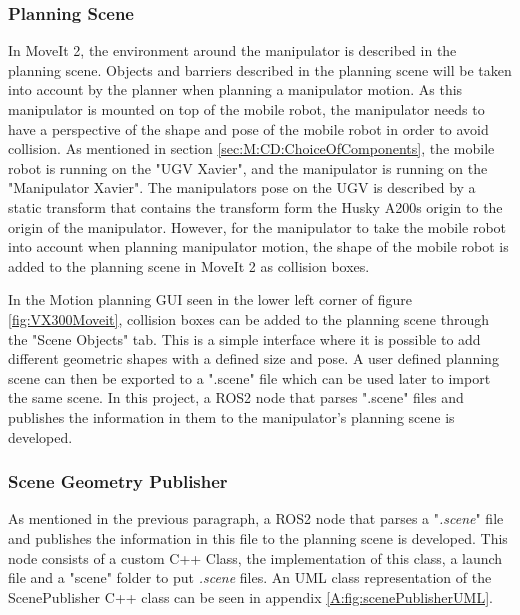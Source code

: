 \subsubsection{Planning Scene}
In MoveIt 2, the environment around the manipulator is described in the planning scene. Objects and barriers described in the planning scene will be taken into account by the planner when planning a manipulator motion. As this manipulator is mounted on top of the mobile robot, the manipulator needs to have a perspective of the shape and pose of the mobile robot in order to avoid collision. As mentioned in section \ref{sec:M:CD:ChoiceOfComponents}, the mobile robot is running on the "UGV Xavier", and the manipulator is running on the "Manipulator Xavier". 
The manipulators pose on the UGV is described by a static transform that contains the transform form the Husky A200s origin to the origin of the manipulator. However, for the manipulator to take the mobile robot into account when planning manipulator motion, the shape of the mobile robot is added to the planning scene in MoveIt 2 as collision boxes.

In the Motion planning GUI seen in the lower left corner of figure \ref{fig:VX300Moveit}, collision boxes can be added to the planning scene through the "Scene Objects" tab. This is a simple interface where it is possible to add different geometric shapes with a defined size and pose. A user defined planning scene can then be exported to a ".scene" file which can be used later to import the same scene. In this project, a ROS2 node that parses ".scene" files and publishes the information in them to the manipulator's planning scene is developed.

\subsubsection{Scene Geometry Publisher} \label{sec:M:PAP:SceneGeometryPublisher}
As mentioned in the previous paragraph, a ROS2 node that parses a "\textit{.scene}" file and publishes the information in this file to the planning scene is developed. This node consists of a custom C++ Class, the implementation of this class, a launch file and a "scene" folder to put \textit{.scene} files. An UML class representation of the ScenePublisher C++ class can be seen in appendix \ref{A:fig:scenePublisherUML}.

